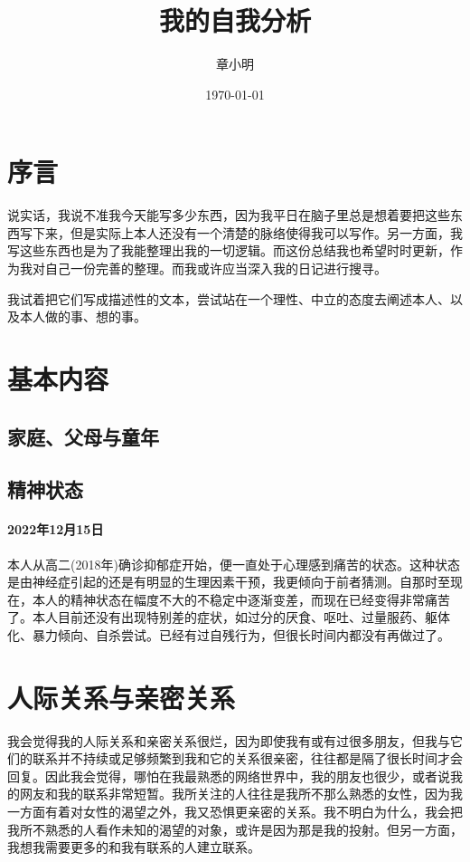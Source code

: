 \documentclass{article}
\title{我的自我分析}
\author{章小明}
\date{\today}
\begin{document}
\maketitle
\tableofcontents

\section{序言}
    说实话，我说不准我今天能写多少东西，因为我平日在脑子里总是想着要把这些东西写下来，但是实际上本人还没有一个清楚的脉络使得我可以写作。另一方面，我写这些东西也是为了我能整理出我的一切逻辑。而这份总结我也希望时时更新，作为我对自己一份完善的整理。而我或许应当深入我的日记进行搜寻。

    我试着把它们写成描述性的文本，尝试站在一个理性、中立的态度去阐述本人、以及本人做的事、想的事。

\section{基本内容}
\subsection{家庭、父母与童年}

\subsection{精神状态}
    \paragraph{2022年12月15日} 本人从高二(2018年)确诊抑郁症开始，便一直处于心理感到痛苦的状态。这种状态是由神经症引起的还是有明显的生理因素干预，我更倾向于前者猜测。自那时至现在，本人的精神状态在幅度不大的不稳定中逐渐变差，而现在已经变得非常痛苦了。本人目前还没有出现特别差的症状，如过分的厌食、呕吐、过量服药、躯体化、暴力倾向、自杀尝试。已经有过自残行为，但很长时间内都没有再做过了。

\section{人际关系与亲密关系}
    我会觉得我的人际关系和亲密关系很烂，因为即使我有或有过很多朋友，但我与它们的联系并不持续或足够频繁到我和它的关系很亲密，往往都是隔了很长时间才会回复。因此我会觉得，哪怕在我最熟悉的网络世界中，我的朋友也很少，或者说我的网友和我的联系非常短暂。我所关注的人往往是我所不那么熟悉的女性，因为我一方面有着对女性的渴望之外，我又恐惧更亲密的关系。我不明白为什么，我会把我所不熟悉的人看作未知的渴望的对象，或许是因为那是我的投射。但另一方面，我想我需要更多的和我有联系的人建立联系。
    
\end{document}
